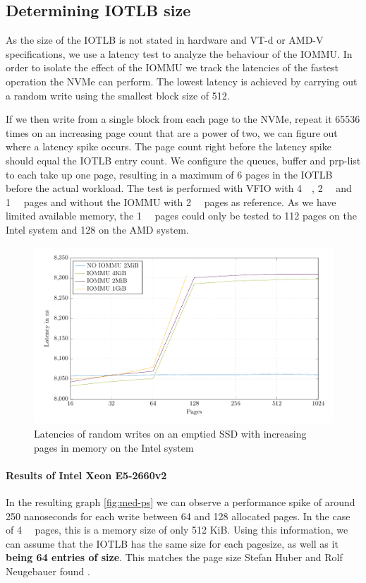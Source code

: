 \subsection{Determining IOTLB size}
As the size of the IOTLB is not stated in hardware and VT-d or AMD-V specifications, we use a latency test to analyze the behaviour of the IOMMU.
In order to isolate the effect of the IOMMU we track the latencies of the fastest operation the NVMe can perform. The lowest latency is achieved by carrying out a random write using the smallest block size of \qty{512}{\byte}.

If we then write from a single block from each page to the NVMe, repeat it 65536 times on an increasing page count that are a power of two, we can figure out where a latency spike occurs. The page count right before the latency spike should equal the IOTLB entry count. We configure the queues, buffer and prp-list to each take up one page, resulting in a maximum of 6 pages in the IOTLB before the actual workload.
The test is performed with VFIO with \qty{4}{\kibi\byte}, \qty{2}{\mebi\byte} and \qty{1}{\gibi\byte} pages and without the IOMMU with \qty{2}{\mebi\byte} pages as reference. As we have limited available memory, the \qty{1}{\gibi\byte} pages could only be tested to 112 pages on the Intel system and 128 on the AMD system.

\begin{figure}[H]
  \centering
  \includegraphics[width=\textwidth]{figures/psmeds}
  \caption{Latencies of random writes on an emptied SSD with increasing pages in memory on the Intel system}
  \label{fig:med-ps}
\end{figure}

\paragraph{Results of Intel Xeon E5-2660v2}
In the resulting graph \autoref{fig:med-ps} we can observe a performance spike of around 250 nanoseconds for each write between 64 and 128 allocated pages. In the case of \qty{4}{\kibi\byte} pages, this is a memory size of only 512 KiB. Using this information, we can assume that the IOTLB has the same size for each pagesize, as well as it \textbf{being 64 entries of size}. This matches the page size Stefan Huber and Rolf Neugebauer found \cite{iommuhuber}\cite{pcieperfnegebauer}.

